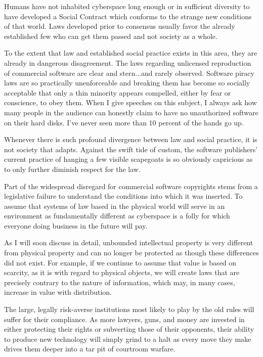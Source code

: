 \documentclass[
]{article}
\begin{document}
Humans have not inhabited cyberspace long enough or in sufficient
diversity to have developed a Social Contract which conforms to the
strange new conditions of that world. Laws developed prior to consensus
usually favor the already established few who can get them passed and
not society as a whole.

To the extent that law and established social practice exists in this
area, they are already in dangerous disagreement. The laws regarding
unlicensed reproduction of commercial software are clear and stern...and
rarely observed. Software piracy laws are so practically unenforceable
and breaking them has become so socially acceptable that only a thin
minority appears compelled, either by fear or conscience, to obey them.
When I give speeches on this subject, I always ask how many people in
the audience can honestly claim to have no unauthorized software on
their hard disks. I've never seen more than 10 percent of the hands go
up.

Whenever there is such profound divergence between law and social
practice, it is not society that adapts. Against the swift tide of
custom, the software publishers' current practice of hanging a few
visible scapegoats is so obviously capricious as to only further
diminish respect for the law.

Part of the widespread disregard for commercial software copyrights
stems from a legislative failure to understand the conditions into which
it was inserted. To assume that systems of law based in the physical
world will serve in an environment as fundamentally different as
cyberspace is a folly for which everyone doing business in the future
will pay.

As I will soon discuss in detail, unbounded intellectual property is
very different from physical property and can no longer be protected as
though these differences did not exist. For example, if we continue to
assume that value is based on scarcity, as it is with regard to physical
objects, we will create laws that are precisely contrary to the nature
of information, which may, in many cases, increase in value with
distribution.

The large, legally risk-averse institutions most likely to play by the
old rules will suffer for their compliance. As more lawyers, guns, and
money are invested in either protecting their rights or subverting those
of their opponents, their ability to produce new technology will simply
grind to a halt as every move they make drives them deeper into a tar
pit of courtroom warfare.
\end{document}
